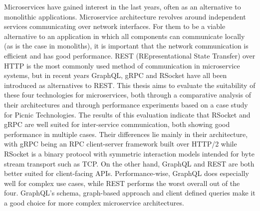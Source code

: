


\begin{abstracts}        %

Microservices have gained interest in the last years, often as an alternative to monolithic applications. Microservice architecture revolves around independent services communicating over network interfaces. For them to be a viable alternative to an application in which all components can communicate locally (as is the case in monoliths), it is important that the network communication is efficient and has good performance. REST (REpresentational State Transfer) over HTTP is the most commonly used method of communication in microservice systems, but in recent years GraphQL, gRPC and RSocket have all been introduced as alternatives to REST. This thesis aims to evaluate the suitability of these four technologies for microservices, both through a comparative analysis of their architectures and through performance experiments based on a case study for Picnic Technologies. The results of this evaluation indicate that RSocket and gRPC are well suited for inter-service communication, both showing good performance in multiple cases. Their differences lie mainly in their architecture, with gRPC being an RPC client-server framework built over HTTP/2 while RSocket is a binary protocol with symmetric interaction models intended for byte stream transport such as TCP. On the other hand, GraphQL and REST are both better suited for client-facing APIs. Performance-wise, GraphQL does especially well for complex use cases, while REST performs the worst overall out of the four. GraphQL's schema, graph-based approach and client defined queries make it a good choice for more complex microservice architectures.
\end{abstracts}


